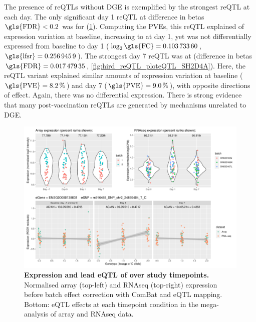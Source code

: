 The presence of \glspl{reQTL} without \gls{DGE} is exemplified by the strongest \gls{reQTL} at each day.
The only significant day 1 \gls{reQTL} at difference in betas $\text{\gls{FDR}} < 0.2$ was for  (\cref{fig:hird_reQTL_ploteQTL_ADCY3}).
Computing the \glspl{PVE}, this \gls{reQTL} explained  of  expression variation at baseline, increasing to  at day 1,
yet  was not differentially expressed from baseline to day 1 ($\log_2\text{\gls{FC}} = \num{0.10373360}$, $\text{\gls{lfsr}}=\num{0.2569459}$).
%
The strongest day 7 \gls{reQTL} was at  
(difference in betas $\text{\gls{FDR}} = \num{0.01747935}$, \cref{fig:hird_reQTL_ploteQTL_SH2D4A}).
Here, the \gls{reQTL} variant explained similar amounts of expression variation at baseline ($\text{\gls{PVE}}=\percentage{0.08229266}$) and day 7 ($\text{\gls{PVE}}=\percentage{0.08956865}$), with opposite directions of effect.
Again, there was no differential expression.
There is strong evidence that many post-vaccination \glspl{reQTL} are generated by mechanisms unrelated to \gls{DGE}.

\begin{figure}
    \centering
    \includegraphics[width=1.0\textwidth,page=1]{mainmatter/figures/chapter_03/plot_dge_eqtl_genotypes.ENSG00000138031,rs916485_SNP_chr2_24859404_T_C.pdf}
    \caption{
        \textbf{Expression and lead \gls{eQTL} of  over study timepoints.}
        Normalised array (top-left) and \gls{RNAseq} (top-right) expression before batch effect correction with ComBat and \gls{eQTL} mapping. 
        Bottom: \gls{eQTL} effects at each timepoint condition in the mega-analysis of array and \gls{RNAseq} data.
    }
    \label{fig:hird_reQTL_ploteQTL_ADCY3}
\end{figure}

